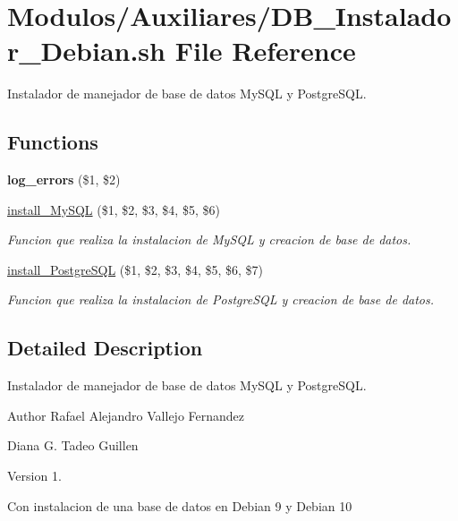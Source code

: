 \hypertarget{DB__Instalador__Debian_8sh}{}\section{Modulos/\+Auxiliares/\+D\+B\+\_\+\+Instalador\+\_\+\+Debian.sh File Reference}
\label{DB__Instalador__Debian_8sh}


Instalador de manejador de base de datos My\+S\+QL y Postgre\+S\+QL.  


\subsection*{Functions}
\begin{DoxyCompactItemize}
\item 
\mbox{\label{DB__Instalador__Debian_8sh_a92067b58a8478c9841b2cd9b75ea3565}} 
{\bfseries log\+\_\+errors} (\$1, \$2)
\item 
\hyperlink{DB__Instalador__Debian_8sh_ac8bff836d4f7d263dbcf02890f2c025d}{install\+\_\+\+My\+S\+QL} (\$1, \$2, \$3, \$4, \$5, \$6)
\begin{DoxyCompactList}\small\item\em Funcion que realiza la instalacion de My\+S\+QL y creacion de base de datos. \end{DoxyCompactList}\item 
\hyperlink{DB__Instalador__Debian_8sh_a56ea9a82dabc1a9f02e4d35cec23e802}{install\+\_\+\+Postgre\+S\+QL} (\$1, \$2, \$3, \$4, \$5, \$6, \$7)
\begin{DoxyCompactList}\small\item\em Funcion que realiza la instalacion de Postgre\+S\+QL y creacion de base de datos. \end{DoxyCompactList}\end{DoxyCompactItemize}


\subsection{Detailed Description}
Instalador de manejador de base de datos My\+S\+QL y Postgre\+S\+QL. 

\begin{DoxyAuthor}{Author}
Rafael Alejandro Vallejo Fernandez 

Diana G. Tadeo Guillen 
\end{DoxyAuthor}
\begin{DoxyVersion}{Version}
1.
\end{DoxyVersion}
Con instalacion de una base de datos en Debian 9 y Debian 10 

